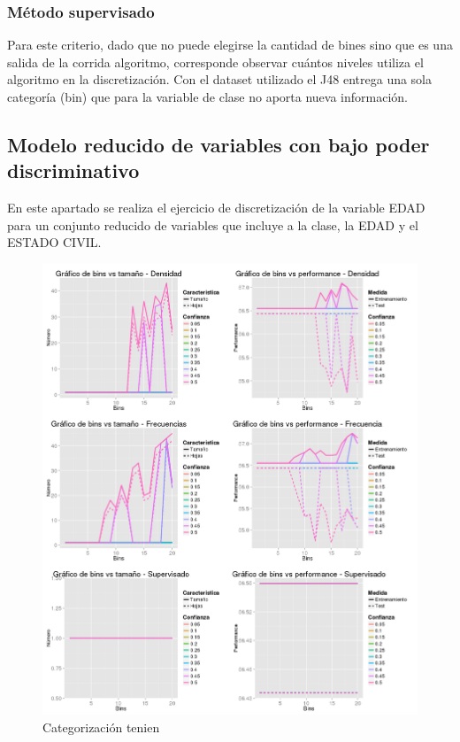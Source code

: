 \documentclass[]{article}
\begin{document}
\subsubsection{Método supervisado}
Para este criterio, dado que no puede elegirse la cantidad de bines sino que es una salida de la corrida algoritmo, corresponde observar cuántos niveles utiliza el algoritmo en la discretización. Con el dataset utilizado el J48 entrega una sola categoría (bin) que para la variable de clase no aporta nueva información. 


\subsection{Modelo reducido de variables con bajo poder discriminativo}
En este apartado se realiza el ejercicio de discretización de la variable EDAD para un conjunto reducido de variables que incluye a la clase, la EDAD y el ESTADO CIVIL. 

\begin{figure}[H]
	\includegraphics[scale = 0.38]{4_2_Bins_Selected_var}
	\caption[Ruido]{Categorización tenien}
	\label{4.P4Selected}
\end{figure}
\end{document}
